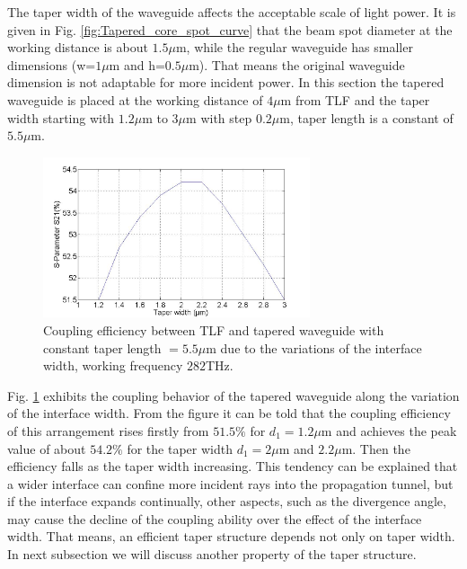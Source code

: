 The taper width of the waveguide affects the acceptable scale of light power. It is given in Fig. \ref {fig:Tapered_core_spot_curve}	 that the beam spot diameter at the working distance is about $1.5\mu$m, while the regular waveguide has smaller dimensions (w=$1\mu$m and h=$0.5\mu$m). That means the original waveguide dimension is not adaptable for more incident power. In this section the tapered waveguide is placed at the working distance of $4\mu$m from TLF and the taper width starting with $1.2\mu$m to $3\mu$m with step $0.2\mu$m, taper length is a constant of $5.5\mu$m. \\

\begin{figure}[!ht]
\centering
\includegraphics[width=0.7\textwidth]{bilder/tapered_waveguide_wxx}
\caption{Coupling efficiency between TLF and tapered waveguide with constant taper length $= 5.5\mu$m due to the variations of the interface width, working frequency $282$THz.}
\label{fig:tapered_waveguide_wxx}
\end{figure}
Fig. \ref{fig:tapered_waveguide_wxx} exhibits the coupling behavior of the tapered waveguide along the variation of the interface width. From the figure it can be told that the coupling efficiency of this arrangement rises firstly from $51.5\%$ for $d_{1}=1.2\mu$m and achieves the peak value of about $54.2\%$ for the taper width $d_{1}=2\mu$m and $2.2\mu$m. Then the efficiency falls as the taper width increasing. This tendency can be explained that a wider interface can confine more incident rays into the propagation tunnel, but if the interface expands continually, other aspects, such as the divergence angle, may cause the decline of the coupling ability over the effect of the interface width.  That means, an efficient taper structure depends not only on taper width.  In next subsection we will discuss another property of the taper structure.\\ 

